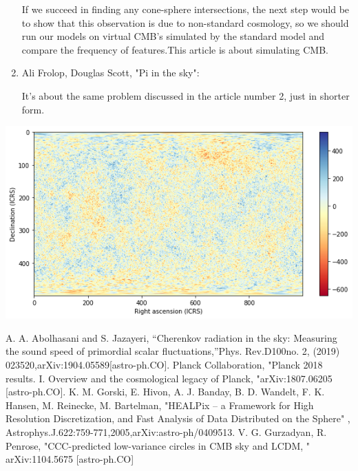 \documentclass{article}
\begin{document}
\begin{multicols}{2}
\begin{enumerate}
If we succeed in finding any cone-sphere intersections, the next step would be to show that this observation is due to non-standard cosmology, so we should run our models on virtual CMB's simulated by the standard model and compare the frequency of features.This article is about simulating CMB.

\item
Ali Frolop, Douglas Scott, "Pi in the sky":

It's about the same problem discussed in the article number 2, just  in shorter form.

\end{enumerate}


\end{multicols}

\includegraphics[width=1\textwidth]{cmb.png}
\label{fig:CMB}

\begin{thebibliography}{99}



 A. A. Abolhasani and S. Jazayeri, “Cherenkov radiation in the sky:  Measuring the sound speed of primordial scalar fluctuations,”Phys. Rev.D100no. 2, (2019) 023520,arXiv:1904.05589[astro-ph.CO].
 Planck Collaboration, "Planck 2018 results. I. Overview and the cosmological legacy of Planck, "arXiv:1807.06205 [astro-ph.CO].
K. M. Gorski, E. Hivon, A. J. Banday, B. D. Wandelt, F. K. Hansen, M. Reinecke, M. Bartelman, "HEALPix -- a Framework for High Resolution Discretization, and Fast Analysis of Data Distributed on the Sphere" , 	Astrophys.J.622:759-771,2005,arXiv:astro-ph/0409513.
V. G. Gurzadyan, R. Penrose, "CCC-predicted low-variance circles in CMB sky and LCDM, " 	arXiv:1104.5675 [astro-ph.CO]




\end{thebibliography}
\end{document}
